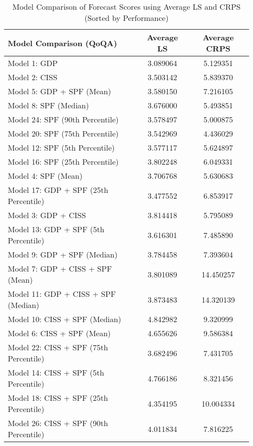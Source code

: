 \documentclass{article}
\begin{document}
\begin{table}[h!]
    \centering
    \caption{Model Comparison of Forecast Scores using Average LS and CRPS (Sorted by Performance)}
    \begin{adjustbox}{width=\textwidth}
    \begin{tabular}{l S[table-format=2.6] S[table-format=2.6]}
        \toprule
        \textbf{Model Comparison (QoQA)} & \textbf{Average LS} & \textbf{Average CRPS} \\
        \midrule
        Model 1: GDP & 3.089064 & 5.129351 \\
        Model 2: CISS & 3.503142 & 5.839370 \\
        Model 5: GDP + SPF (Mean) & 3.580150 & 7.216105 \\
        Model 8: SPF (Median) & 3.676000 & 5.493851 \\
        Model 24: SPF (90th Percentile) & 3.578497 & 5.000875 \\
        Model 20: SPF (75th Percentile) & 3.542969 & 4.436029 \\
        Model 12: SPF (5th Percentile) & 3.577117 & 5.624897 \\
        Model 16: SPF (25th Percentile) & 3.802248 & 6.049331 \\
        Model 4: SPF (Mean) & 3.706768 & 5.630683 \\
        Model 17: GDP + SPF (25th Percentile) & 3.477552 & 6.853917 \\
        Model 3: GDP + CISS & 3.814418 & 5.795089 \\
        Model 13: GDP + SPF (5th Percentile) & 3.616301 & 7.485890 \\
        Model 9: GDP + SPF (Median) & 3.784458 & 7.393604 \\
        Model 7: GDP + CISS + SPF (Mean) & 3.801089 & 14.450257 \\
        Model 11: GDP + CISS + SPF (Median) & 3.873483 & 14.320139 \\
        Model 10: CISS + SPF (Median) & 4.842982 & 9.320999 \\
        Model 6: CISS + SPF (Mean) & 4.655626 & 9.586384 \\
        Model 22: CISS + SPF (75th Percentile) & 3.682496 & 7.431705 \\
        Model 14: CISS + SPF (5th Percentile) & 4.766186 & 8.321456 \\
        Model 18: CISS + SPF (25th Percentile) & 4.354195 & 10.004334 \\
        Model 26: CISS + SPF (90th Percentile) & 4.011834 & 7.816225 \\

\end{tabular}
\end{adjustbox}
\end{table}
\end{document}
